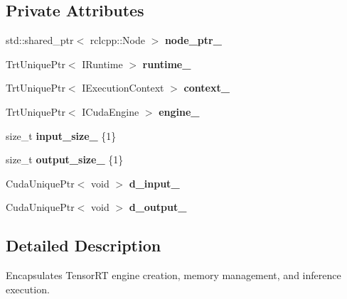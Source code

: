 \subsection*{Private Attributes}
\begin{DoxyCompactItemize}
\item 
\mbox{\label{classInferenceEngine_a6f9115552d34f667591bbe5ad1c3df2a}} 
std\+::shared\+\_\+ptr$<$ rclcpp\+::\+Node $>$ {\bfseries node\+\_\+ptr\+\_\+}
\item 
\mbox{\label{classInferenceEngine_a356266bb3a4b5caa98bb5e1302e8160b}} 
Trt\+Unique\+Ptr$<$ I\+Runtime $>$ {\bfseries runtime\+\_\+}
\item 
\mbox{\label{classInferenceEngine_a89a6c2706b1cab79fd9eacf5cd7f82be}} 
Trt\+Unique\+Ptr$<$ I\+Execution\+Context $>$ {\bfseries context\+\_\+}
\item 
\mbox{\label{classInferenceEngine_a1e7992d16fe4b5e25eef0517ec67bccd}} 
Trt\+Unique\+Ptr$<$ I\+Cuda\+Engine $>$ {\bfseries engine\+\_\+}
\item 
\mbox{\label{classInferenceEngine_af0697224adebb8e40690a83db827d248}} 
size\+\_\+t {\bfseries input\+\_\+size\+\_\+} \{1\}
\item 
\mbox{\label{classInferenceEngine_ac88b59cb61f651e6aedb8767f78c2437}} 
size\+\_\+t {\bfseries output\+\_\+size\+\_\+} \{1\}
\item 
\mbox{\label{classInferenceEngine_a7f9db5fbd5c9fc93ac1d09e8b41c4b1f}} 
Cuda\+Unique\+Ptr$<$ void $>$ {\bfseries d\+\_\+input\+\_\+}
\item 
\mbox{\label{classInferenceEngine_aada91220d42a1650c76797f95dc3089f}} 
Cuda\+Unique\+Ptr$<$ void $>$ {\bfseries d\+\_\+output\+\_\+}
\end{DoxyCompactItemize}


\subsection{Detailed Description}
Encapsulates Tensor\+RT engine creation, memory management, and inference execution. 

